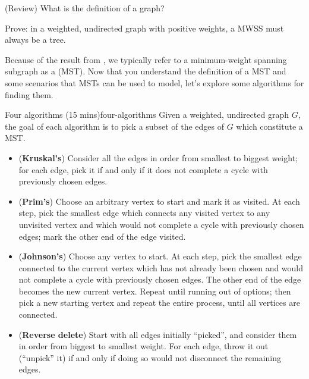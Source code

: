 \documentclass{tufte-handout}
\begin{document}
\begin{questions}
\item (Review) What is the definition of a  graph?
\item \label{q:mwss-tree} Prove: in a weighted, undirected graph with
  positive weights, a MWSS must always be a tree. 
\end{questions}

\pause

Because of the result from , we typically refer to
a minimum-weight spanning subgraph as a 
(MST).  Now that you understand the definition of a MST and some
scenarios that MSTs can be used to model, let's explore some
algorithms for finding them.

\begin{model*}{Four algorithms (15 mins)}{four-algorithms}
  Given a weighted, undirected graph $G$, the goal of each algorithm
  is to pick a subset of the edges of $G$ which constitute a MST.
  \begin{itemize}
  \item (\textbf{Kruskal's}) Consider all the edges in order from
    smallest to biggest weight; for each edge, pick it if and only if
    it does not complete a cycle with previously chosen edges.
  \item (\textbf{Prim's}) Choose an arbitrary vertex to start and mark
    it as visited.  At each step, pick the smallest edge which
    connects any visited vertex to any unvisited vertex and which would
    not complete a cycle with previously chosen edges; mark the other
    end of the edge visited.
  \item (\textbf{Johnson's}) Choose any vertex to start.  At each
    step, pick the smallest edge connected to the current vertex which
    has not already been chosen and would not complete a cycle with
    previously chosen edges.  The other end of the edge becomes the
    new current vertex.  Repeat until running out of options; then
    pick a new starting vertex and repeat the entire process, until
    all vertices are connected.
  \item (\textbf{Reverse delete}) Start with all edges initially
    ``picked'', and consider them in order from biggest to smallest
    weight.  For each edge, throw it out (\ie ``unpick'' it) if and
    only if doing so would not disconnect the remaining edges.
  \end{itemize}
\end{model*}
\end{document}

